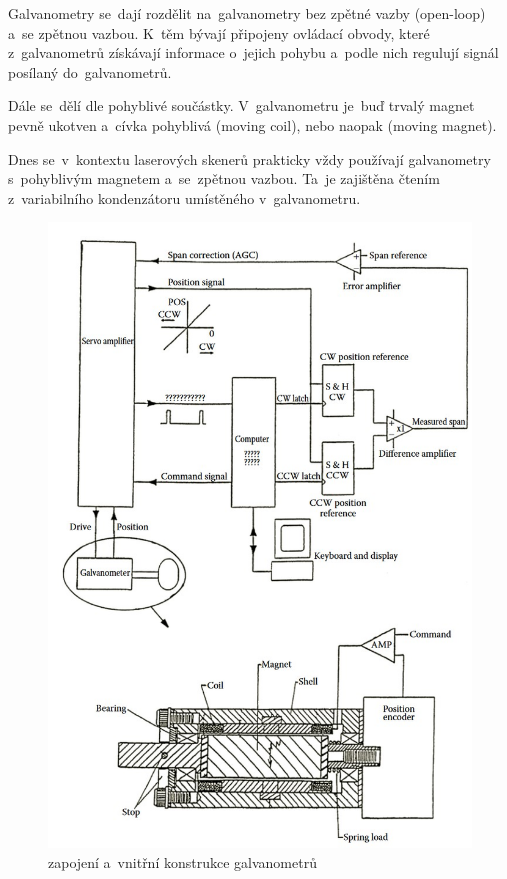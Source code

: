 Galvanometry se~dají rozdělit na~galvanometry bez zpětné vazby (open-loop) a~se zpětnou vazbou. K~těm bývají připojeny ovládací obvody, které z~galvanometrů získávají informace o~jejich pohybu a~podle nich regulují signál posílaný do~galvanometrů.~\cite{wiki-galvo}

Dále se~dělí dle pohyblivé součástky. V~galvanometru je~buď trvalý magnet pevně ukotven a~cívka pohyblivá (moving coil), nebo naopak (moving magnet). %

Dnes se~v~kontextu laserových skenerů prakticky vždy používají galvanometry s~pohyblivým magnetem a~se~zpětnou vazbou. Ta~je zajištěna čtením z~variabilního kondenzátoru umístěného v~galvanometru.

\begin{figure}[!htb]
  \centering
  \includegraphics[width=1\textwidth]{img/galvanometer-detail.jpg}
  \caption{\label{fig:galvanometer-detail} zapojení a~vnitřní konstrukce galvanometrů}
\end{figure}

